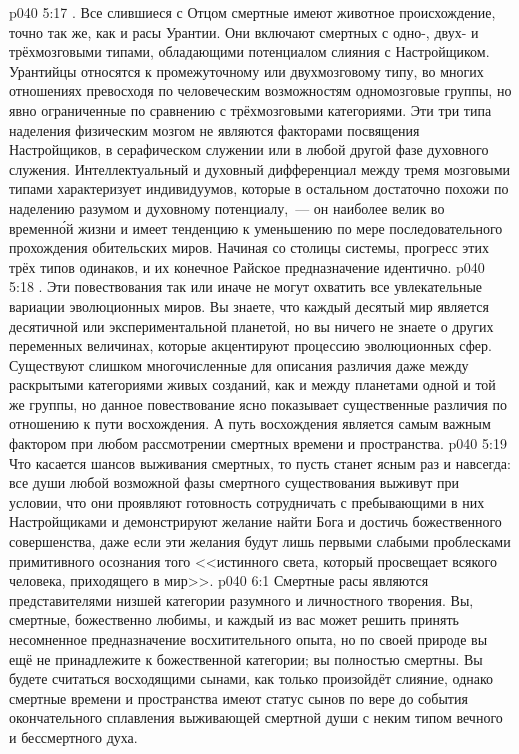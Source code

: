 \vs p040 5:17 \pc {}. Все слившиеся с Отцом смертные имеют животное происхождение, точно так же, как и расы Урантии. Они включают смертных с одно\hyp{}, двух\hyp{} и трёхмозговыми типами, обладающими потенциалом слияния с Настройщиком. Урантийцы относятся к промежуточному или двухмозговому типу, во многих отношениях превосходя по человеческим возможностям одномозговые группы, но явно ограниченные по сравнению с трёхмозговыми категориями. Эти три типа наделения физическим мозгом не являются факторами посвящения Настройщиков, в серафическом служении или в любой другой фазе духовного служения. Интеллектуальный и духовный дифференциал между тремя мозговыми типами характеризует индивидуумов, которые в остальном достаточно похожи по наделению разумом и духовному потенциалу,~--- он наиболее велик во временн\'ой жизни и имеет тенденцию к уменьшению по мере последовательного прохождения обительских миров. Начиная со столицы системы, прогресс этих трёх типов одинаков, и их конечное Райское предназначение идентично.
\vs p040 5:18 \pc {}. Эти повествования так или иначе не могут охватить все увлекательные вариации эволюционных миров. Вы знаете, что каждый десятый мир является десятичной или экспериментальной планетой, но вы ничего не знаете о других переменных величинах, которые акцентируют процессию эволюционных сфер. Существуют слишком многочисленные для описания различия даже между раскрытыми категориями живых созданий, как и между планетами одной и той же группы, но данное повествование ясно показывает существенные различия по отношению к пути восхождения. А путь восхождения является самым важным фактором при любом рассмотрении смертных времени и пространства.
\vs p040 5:19 \pc Что касается шансов выживания смертных, то пусть станет ясным раз и навсегда: все души любой возможной фазы смертного существования выживут при условии, что они проявляют готовность сотрудничать с пребывающими в них Настройщиками и демонстрируют желание найти Бога и достичь божественного совершенства, даже если эти желания будут лишь первыми слабыми проблесками примитивного осознания того <<истинного света, который просвещает всякого человека, приходящего в мир>>.
\vs p040 6:1 Смертные расы являются представителями низшей категории разумного и личностного творения. Вы, смертные, божественно любимы, и каждый из вас может решить принять несомненное предназначение восхитительного опыта, но по своей природе вы ещё не принадлежите к божественной категории; вы полностью смертны. Вы будете считаться восходящими сынами, как только произойдёт слияние, однако смертные времени и пространства имеют статус сынов по вере до события окончательного сплавления выживающей смертной души с неким типом вечного и бессмертного духа.
